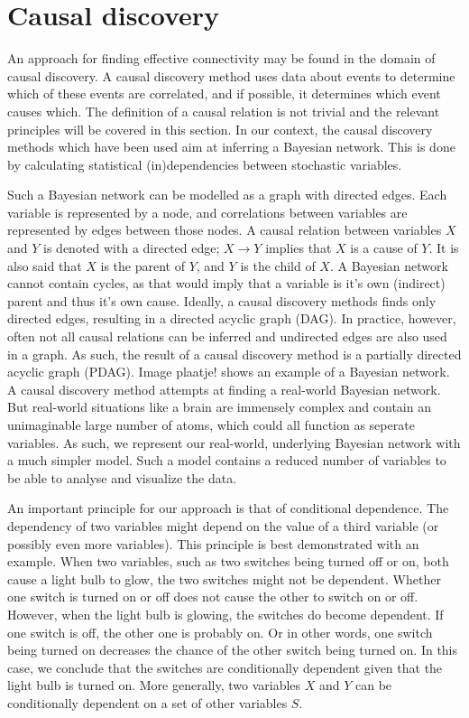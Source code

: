 \documentclass[a4paper, 10pt, english, twocolumn]{article}
\title{\fontfamily{phv}\selectfont{Causal Discovery methods for Effective Connectivity}}
\author{
  \textbf{R. Janssen} - \href{mailto:ramon.janssen@student.ru.nl}{ramon.janssen@student.ru.nl} \\
  \textbf{T. de Ruijter} - \href{mailto:t.deruijter@student.ru.nl}{t.deruijter@student.ru.nl}\\
}
\date{\fontfamily{ptm}\selectfont{\small{\bfseries{\today - Radboud
Universiteit Nijmegen}}}\\[0.5cm]\rule{\linewidth}{0.3mm}}
\begin{document}
\maketitle

\section{Causal discovery}
An approach for finding effective connectivity may be found in the domain of causal discovery.
A causal discovery method uses data about events to determine which of these events are correlated, and if possible, it determines which event causes which.
The definition of a causal relation is not trivial \cite{?} and the relevant principles will be covered in this section.
In our context, the causal discovery methods which have been used aim at inferring a Bayesian network.
This is done by calculating statistical (in)dependencies between stochastic variables.

Such a Bayesian network can be modelled as a graph with directed edges.
Each variable is represented by a node, and correlations between variables are represented by edges between those nodes.
A causal relation between variables $X$ and $Y$ is denoted with a directed edge; $X \rightarrow Y$ implies that $X$ is a cause of $Y$.
It is also said that $X$ is the parent of $Y$, and $Y$ is the child of $X$.
A Bayesian network cannot contain cycles, as that would imply that a variable is it's own (indirect) parent and thus it's own cause.
Ideally, a causal discovery methods finds only directed edges, resulting in a directed acyclic graph (DAG).
In practice, however, often not all causal relations can be inferred and undirected edges are also used in a graph.
As such, the result of a causal discovery method is a partially directed acyclic graph (PDAG).
Image {plaatje!} shows an example of a Bayesian network.
A causal discovery method attempts at finding a real-world Bayesian network.
But real-world situations like a brain are immensely complex and contain an unimaginable large number of atoms, which could all function as seperate variables.
As such, we represent our real-world, underlying Bayesian network with a much simpler model.
Such a model contains a reduced number of variables to be able to analyse and visualize the data.

An important principle for our approach is that of conditional dependence.
The dependency of two variables might depend on the value of a third variable (or possibly even more variables).
This principle is best demonstrated with an example.
When two variables, such as two switches being turned off or on, both cause a light bulb to glow, the two switches might not be dependent.
Whether one switch is turned on or off does not cause the other to switch on or off.
However, when the light bulb is glowing, the switches do become dependent.
If one switch is off, the other one is probably on.
Or in other words, one switch being turned on decreases the chance of the other switch being turned on.
In this case, we conclude that the switches are conditionally dependent given that the light bulb is turned on.
More generally, two variables $X$ and $Y$ can be conditionally dependent on a set of other variables $S$. %
\end{document}
